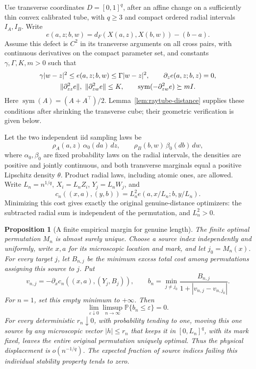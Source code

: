 \documentclass[11pt,reqno]{amsart}
\newtheorem{proposition}[theorem]{Proposition}
\theoremstyle{definition}
\theoremstyle{remark}
\numberwithin{equation}{section}
\newcommand{\Pp}{\mathbb P}
\begin{document}
Use transverse coordinates \(D=[0,1]^q\), after an affine change on
a sufficiently thin convex calibrated tube, with \(q\ge3\) and
compact ordered radial intervals \(I_A,I_B\). Write
\[
 e(a,z;b,w)=d_F(X(a,z),X(b,w))-(b-a).
\]
Assume this defect is \(C^2\) in its transverse arguments on all
cross pairs, with continuous derivatives on the compact parameter
set, and constants \(\gamma,\Gamma,K,m>0\) such that
\begin{gather}
 \gamma|w-z|^2\le e(a,z;b,w)\le\Gamma|w-z|^2,\qquad
 \partial_z e(a,z;b,z)=0, \notag\\
 \|\partial_{zz}^2 e\|,\ \|\partial_{zw}^2 e\|\le K,\qquad
 \operatorname{sym}(-\partial_{zw}^2 e)\succeq mI.
 \label{eq:highd-curved-stability-hypotheses}
\end{gather}
Here \(\operatorname{sym}(A)=(A+A^\top)/2\).
Lemma~\ref{lem:raytube-distance} supplies these conditions after
shrinking the transverse cube; their geometric verification is
given below.

Let the two independent iid sampling laws be
\[
 \rho_A(a,z)\,\alpha_0(da)\,dz,\qquad
 \rho_B(b,w)\,\beta_0(db)\,dw,
\]
where \(\alpha_0,\beta_0\) are fixed probability laws on the radial
intervals, the densities are positive and jointly continuous, and
both transverse marginals equal a positive Lipschitz density
\(\theta\). Product radial laws, including atomic ones, are allowed.
Write \(L_n=n^{1/q}\), \(X_i=L_nZ_i\), \(Y_j=L_nW_j\), and
\[
 c_n((x,a),(y,b))=L_n^2e(a,x/L_n;b,y/L_n).
\]
Minimizing this cost gives exactly the original genuine-distance
optimizers: the subtracted radial sum is independent of the
permutation, and \(L_n^2>0\).

\begin{proposition}[A finite empirical margin for genuine length]
\label{prop:highd-curved-empirical-stability}
The finite optimal permutation \(M_n\) is almost surely unique.
Choose a source index independently and uniformly, write \(x,a\)
for its microscopic location and mark, and let \(j_0=M_n(x)\).
For every target \(j\), let \(B_{n,j}\) be the minimum excess total
cost among permutations assigning this source to \(j\). Put
\[
 v_{n,j}=-\partial_x c_n((x,a),(Y_j,B_j)),\qquad
 b_n=\min_{j\ne j_0}
       \frac{B_{n,j}}{1+|v_{n,j}-v_{n,j_0}|}.
\]
For \(n=1\), set this empty minimum to \(+\infty\).
Then
\begin{equation}
 \lim_{\varepsilon\downarrow0}\limsup_{n\to\infty}
       \Pp\{b_n\le\varepsilon\}=0.
 \label{eq:highd-curved-empirical-margin}
\end{equation}
For every deterministic \(r_n\downarrow0\), with probability tending
to one, moving this one source by any microscopic vector
\(|h|\le r_n\) that keeps it in \([0,L_n]^q\), with its mark fixed,
leaves the entire original permutation uniquely optimal. Thus the
physical displacement is \(o(n^{-1/q})\). The expected fraction of
source indices failing this individual stability property tends
to zero.
\end{proposition}
\end{document}

